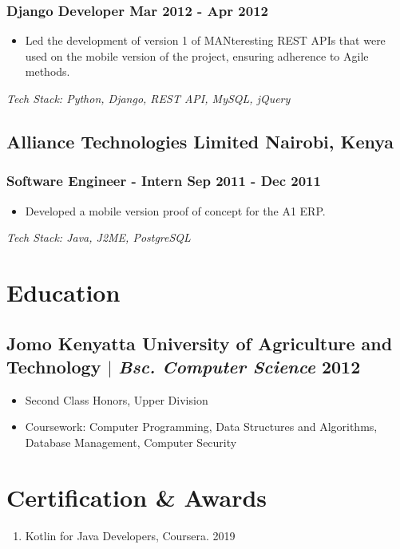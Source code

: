 \documentclass[11pt]{article} %
\newcommand \techstack [1]
    {\small\textit{Tech Stack: {#1}}} %
\begin{document}
\subsubsection{Django Developer \hfill  Mar 2012 - Apr 2012}
\begin{itemize}
    \item Led the development of version 1 of MANteresting REST APIs that were used on the mobile version of the project, ensuring adherence to Agile methods.
\end{itemize}
\techstack{Python, Django, REST API, MySQL, jQuery}
\vspace{0.8em}

\subsection{Alliance Technologies Limited \hfill Nairobi, Kenya}
\subsubsection{Software Engineer - Intern \hfill  Sep 2011 - Dec 2011}
\begin{itemize}
    \item Developed a mobile version proof of concept for the A1 ERP. 
\end{itemize}
\techstack{Java, J2ME, PostgreSQL}
\vspace{0.8em}

\section{Education}
\subsection{Jomo Kenyatta University of Agriculture and Technology $|$ {\normalfont\itshape Bsc. Computer Science} \hfill 2012}
\begin{itemize}
    \item Second Class Honors, Upper Division
    \item Coursework: Computer Programming, Data Structures and Algorithms, Database Management, Computer Security
\end{itemize}


\section{Certification \& Awards}
\begin{enumerate}[label=\null, left=0pt..0pt, itemsep=0pt]
    \item Kotlin for Java Developers, Coursera. \hfill 2019
\end{enumerate}
\end{document}
